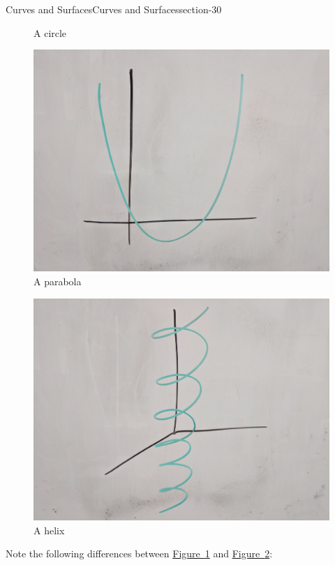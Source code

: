 \documentclass[oneside,10pt,]{article}
\begin{document}
\begin{sectionptx}{Curves and Surfaces}{}{Curves and Surfaces}{}{}{section-30}
\begin{figure}
\caption{A circle\label{figure-46}}
\end{figure}
\begin{figure}
\centering
\includegraphics[width=1\linewidth]{images/parabola.jpg}
\caption{A parabola\label{figure-49}}
\end{figure}
\begin{figure}
\centering
\includegraphics[width=1\linewidth]{images/helix.jpg}
\caption{A helix\label{figure-52}}
\end{figure}
\hypertarget{p-55}{}%
Note the following differences between \hyperref[figure-46]{Figure~\ref{figure-46}} and \hyperref[figure-49]{Figure~\ref{figure-49}}:%
\leavevmode%
\begin{itemize}[label=\textbullet]

\end{itemize}
\end{sectionptx}
\end{document}
